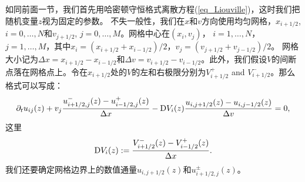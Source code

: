 如同前面一节，我们首先用哈密顿守恒格式离散方程(\ref{eq_Liouville})，这时我们把随机变量$z$视为固定的参数。
不失一般性，我们在$x$和$v$方向使用均匀网格，$x_{i+1/2}$, $i=0,\dotsc, N$和$v_{j+1/2}$, $j = 0, \dotsc, M$。网格中心在$(x_i,v_j)$， $i = 1,\dotsc, N$， $j = 1, \dotsc, M$，其中$x_i = (x_{i+1/2} + x_{i-1/2})/2$，$v_j = (v_{j+1/2} + v_{j-1/2})/2$。 网格大小记为$\Delta x=x_{i+1/2}-x_{i-1/2}$和$\Delta v=v_{i+1/2}-v_{i-1/2}$。此外，我们假设$V$的间断点落在网格点上。令在$x_{i+1/2}$处的$V$的左和右极限分别为$V^+_{i+1/2}$ and $V^-_{i+1/2}$。那么格式可以写成：
\begin{equation}\label{semi_dis}
  \partial_t u_{ij}(z) + v_j\frac{u^-_{i+1/2,j}(z)-u^+_{i-1/2,j}(z)}{\Delta x}-\mathrm{D}V_i(z)\frac{u_{i,j+1/2}(z)-u_{i,j-1/2}(z)}{\Delta v}=0,
\end{equation}
这里
\begin{equation}
  \mathrm{D}V_i(z) := \dfrac{V^-_{i+1/2}(z)-V^+_{i-1/2}(z)}{\Delta x}.
\end{equation}
我们还要确定网格边界上的数值通量$u_{i, j+1/2}(z)$和$u^{\pm}_{i+1/2, j}(z)$。


